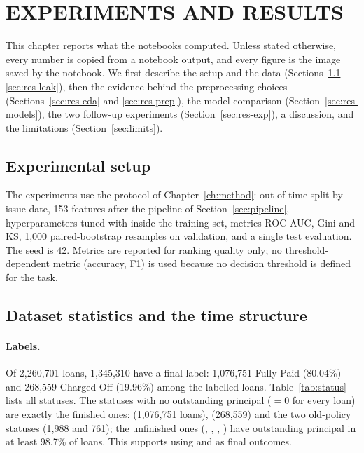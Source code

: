 \section{EXPERIMENTS AND RESULTS}
\label{ch:results}

This chapter reports what the notebooks computed. Unless stated otherwise, every number is copied from a notebook output, and every figure is the image saved by the notebook. We first describe the setup and the data (Sections~\ref{sec:res-setup}--\ref{sec:res-leak}), then the evidence behind the preprocessing choices (Sections~\ref{sec:res-eda} and \ref{sec:res-prep}), the model comparison (Section~\ref{sec:res-models}), the two follow-up experiments (Section~\ref{sec:res-exp}), a discussion, and the limitations (Section~\ref{sec:limits}).

\subsection{Experimental setup}
\label{sec:res-setup}

The experiments use the protocol of Chapter~\ref{ch:method}: out-of-time split by issue date, 153 features after the pipeline of Section~\ref{sec:pipeline}, hyperparameters tuned with  inside the training set, metrics ROC-AUC, Gini and KS, 1,000 paired-bootstrap resamples on validation, and a single test evaluation. The seed is 42. Metrics are reported for ranking quality only; no threshold-dependent metric (accuracy, F1) is used because no decision threshold is defined for the task.

\subsection{Dataset statistics and the time structure}
\label{sec:res-data}

\paragraph{Labels.} Of 2,260,701 loans, 1,345,310 have a final label: 1,076,751 Fully Paid (80.04\%) and 268,559 Charged Off (19.96\%) among the labelled loans. Table~\ref{tab:status} lists all statuses. The statuses with no outstanding principal ($=0$ for every loan) are exactly the finished ones:  (1,076,751 loans),  (268,559) and the two old-policy statuses (1,988 and 761); the unfinished ones (, , , ) have outstanding principal in at least 98.7\% of loans. This supports using  and  as final outcomes.

